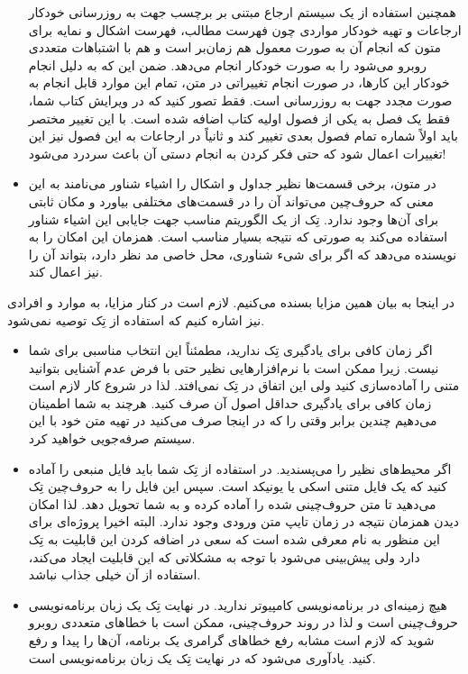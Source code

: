 \begin{itemize}
همچنین استفاده از یک سیستم ارجاع 
 مبتنی بر برچسب جهت به روزرسانی خودکار ارجاعات و تهیه خودکار مواردی چون
 فهرست مطالب، فهرست اشکال و نمایه برای متون که انجام آن به صورت معمول هم 
 زمان‌بر است و هم با اشتباهات متعددی روبرو می‌شود را به صورت خودکار انجام می‌دهد.
 ضمن این که به دلیل انجام خودکار
 این کارها، در صورت انجام تغییراتی در متن، تمام این موارد قابل انجام به صورت مجدد جهت
 به روزرسانی است. فقط تصور کنید که در ویرایش کتاب شما، فقط یک فصل به یکی از
 فصول اولیه کتاب اضافه شده است. با این تغییر مختصر باید اولاً شماره تمام فصول بعدی
 تغییر کند و ثانیاً در ارجاعات به این فصول نیز این تغییرات اعمال شود که حتی فکر کردن 
 به انجام دستی  آن باعث سردرد می‌شود!
 \item در متون، برخی قسمت‌ها نظیر جداول و اشکال را اشیاء شناور می‌نامند به این معنی
 که حروف‌چین می‌تواند آن را در قسمت‌های مختلفی بیاورد و مکان ثابتی برای آن‌ها وجود ندارد.
 تِک از یک الگوریتم مناسب جهت جایابی این اشیاء شناور استفاده می‌کند به صورتی که
 نتیجه بسیار مناسب است. همزمان این امکان را به نویسنده می‌دهد که اگر برای شیء شناوری،
 محل خاصی مد نظر دارد، بتواند آن را نیز اعمال کند.
   \end{itemize}
   
   در اینجا به بیان همین مزایا بسنده می‌کنیم. لازم است در کنار مزایا، به موارد و افرادی 
   نیز اشاره    کنیم که  استفاده از تِک توصیه نمی‌شود. 
   \begin{itemize}
   \item  اگر زمان کافی برای یادگیری تِک ندارید، مطمئناً این انتخاب مناسبی
   برای شما نیست. زیرا ممکن است با نرم‌افزارهایی نظیر  حتی با فرض
   عدم آشنایی بتوانید متنی را آماده‌سازی کنید ولی این اتفاق در تِک نمی‌افتد. لذا در شروع
   کار لازم است زمان کافی برای یادگیری حداقل اصول آن صرف کنید. هرچند به شما
   اطمینان می‌دهیم چندین برابر وقتی را که در اینجا صرف می‌کنید در تهیه متن خود
   با این سیستم صرفه‌جویی خواهید کرد.
   \item اگر محیط‌های 
   نظیر  را می‌پسندید. در استفاده از تِک شما باید فایل منبعی را آماده کنید
   که یک فایل متنی اسکی یا یونیکد است. سپس این فایل را به حروف‌چین تِک 
   می‌دهید تا متن حروف‌چینی شده را آماده کرده و به شما تحویل دهد. لذا امکان دیدن همزمان
   نتیجه در زمان تایپ متن ورودی وجود ندارد. البته اخیرا پروژه‌ای برای این 
   منظور به نام   
   معرفی شده است که سعی در اضافه کردن این قابلیت 
   به  تِک  دارد ولی پیش‌بینی می‌شود با توجه به مشکلاتی که این قابلیت ایجاد می‌کند،
   استفاده از آن خیلی جذاب نباشد.
   \item هیچ زمینه‌ای در برنامه‌نویسی کامپیوتر ندارید. در نهایت تِک یک زبان برنامه‌نویسی
   حروف‌چینی است و لذا در روند حروف‌چینی، ممکن است با خطاهای متعددی 
روبرو شوید که لازم است مشابه رفع خطاهای گرامری
یک برنامه، آن‌ها را پیدا  و رفع کنید.   یادآوری می‌شود که در نهایت تِک یک زبان برنامه‌نویسی است.
   \end{itemize}

